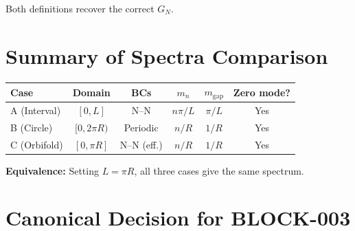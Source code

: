 \documentclass[11pt,a4paper]{article}
\newcommand{\GN}{G_N}
\newcommand{\mgap}{m_{\mathrm{gap}}}
\begin{document}
Both definitions recover the correct $\GN$.

\section{Summary of Spectra Comparison}

\begin{center}
\begin{tabular}{lccccc}
\toprule
\textbf{Case} & \textbf{Domain} & \textbf{BCs} & \textbf{$m_n$} & \textbf{$\mgap$} & \textbf{Zero mode?} \\
\midrule
A (Interval) & $[0, L]$ & N--N & $n\pi/L$ & $\pi/L$ & Yes \\
B (Circle) & $[0, 2\pi R)$ & Periodic & $n/R$ & $1/R$ & Yes \\
C (Orbifold) & $[0, \pi R]$ & N--N (eff.) & $n/R$ & $1/R$ & Yes \\
\bottomrule
\end{tabular}
\end{center}

\textbf{Equivalence:} Setting $L = \pi R$, all three cases give the same spectrum.

\section{Canonical Decision for BLOCK-003}
\end{document}
